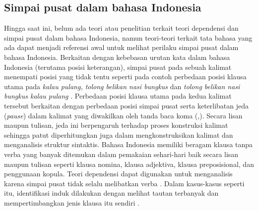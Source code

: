 \subsection{Simpai pusat dalam bahasa Indonesia}
Hingga saat ini, belum ada teori atau penelitian terkait teori dependensi dan simpai pusat dalam bahasa Indonesia, namun teori-teori terkait tata bahasa yang ada dapat menjadi referensi awal untuk melihat perilaku simpai pusat dalam bahasa Indonesia. Berkaitan dengan kebebasan urutan kata dalam bahasa Indonesia (terutama posisi keterangan), simpai pusat pada sebuah kalimat menempati posisi yang tidak tentu seperti pada contoh perbedaan posisi klausa utama pada \textit{kalau pulang, tolong belikan nasi bungkus} dan \textit{tolong belikan nasi bungkus kalau pulang} \citep{sneddon2010indonesian}. Perbedaan posisi klausa utama pada kedua kalimat tersebut berkaitan dengan perbedaan posisi simpai pusat serta keterlibatan jeda (\textit{pause}) dalam kalimat yang diwakilkan oleh tanda baca koma (,). Secara lisan maupun tulisan, jeda ini berpengaruh terhadap proses konstruksi kalimat sehingga patut diperhitungkan juga dalam mengkonstruksikan kalimat dan menganalisis struktur sintaktis. 
Bahasa Indonesia memiliki beragam klausa tanpa verba yang banyak ditemukan dalam pemakaian sehari-hari baik secara lisan maupun tulisan \citep{sneddon2010indonesian} seperti klausa nomina, klausa adjektiva, klausa preposisional, dan penggunaan kopula. Teori dependensi dapat digunakan untuk menganalisis karena simpai pusat tidak selalu melibatkan verba \citep{tesniere1959elements}. Dalam kasus-kasus seperti itu, identifikasi induk dilakukan dengan melihat tautan terbanyak \citep{tesniere1959elements} dan mempertimbangkan jenis klausa itu sendiri \citep{sneddon2010indonesian}.